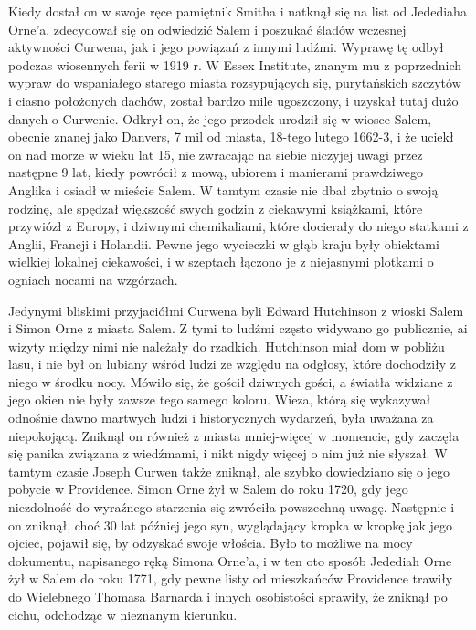 Kiedy dostał on w swoje ręce pamiętnik Smitha i natknął się na list od Jedediaha Orne'a, zdecydował się on odwiedzić Salem i poszukać śladów wczesnej aktywności Curwena, jak i jego powiązań z innymi ludźmi. Wyprawę tę odbył podczas wiosennych ferii w 1919 r. W Essex Institute, znanym mu z poprzednich wypraw do wspaniałego starego miasta rozsypujących się, purytańskich szczytów i ciasno położonych dachów, został bardzo mile ugoszczony, i uzyskał tutaj dużo danych o Curwenie. Odkrył on, że jego przodek urodził się w wiosce Salem, obecnie znanej jako Danvers, 7 mil od miasta, 18-tego lutego 1662-3, i że uciekł on nad morze w wieku lat 15, nie zwracając na siebie niczyjej uwagi przez następne 9 lat, kiedy powrócił z mową, ubiorem i manierami prawdziwego Anglika i osiadł w mieście Salem. W tamtym czasie nie dbał zbytnio o swoją rodzinę, ale spędzał większość swych godzin z ciekawymi książkami, które przywiózł z Europy, i dziwnymi chemikaliami, które docierały do niego statkami z Anglii, Francji i Holandii. Pewne jego wycieczki w głąb kraju były obiektami wielkiej lokalnej ciekawości, i w szeptach łączono je z niejasnymi plotkami o ogniach nocami na wzgórzach. 

Jedynymi bliskimi przyjaciółmi Curwena byli Edward Hutchinson z wioski Salem i Simon Orne z miasta Salem. Z tymi to ludźmi często widywano go publicznie, ai wizyty między nimi nie należały do rzadkich. Hutchinson miał dom w pobliżu lasu, i nie był on lubiany wśród ludzi ze względu na odgłosy, które dochodziły z niego w środku nocy. Mówiło się, że gościł dziwnych gości, a światła widziane z jego okien nie były zawsze tego samego koloru. Wieza, którą się wykazywał odnośnie dawno martwych ludzi i historycznych wydarzeń, była uważana za niepokojącą. Zniknął on również z miasta mniej-więcej w momencie, gdy zaczęła się panika związana z wiedźmami, i nikt nigdy więcej o nim już nie słyszał. W tamtym czasie Joseph Curwen także zniknął, ale szybko dowiedziano się o jego pobycie w Providence. Simon Orne żył w Salem do roku 1720, gdy jego niezdolność do wyraźnego starzenia się zwróciła powszechną uwagę. Następnie i on zniknął, choć 30 lat później jego syn, wyglądający kropka w kropkę jak jego ojciec, pojawił się, by odzyskać swoje włościa. Było to możliwe na mocy dokumentu, napisanego ręką Simona Orne'a, i w ten oto sposób Jedediah Orne żył w Salem do roku 1771, gdy pewne listy od mieszkańców Providence trawiły do Wielebnego Thomasa Barnarda i innych osobistości sprawiły, że zniknął po cichu, odchodząc w nieznanym kierunku.  

